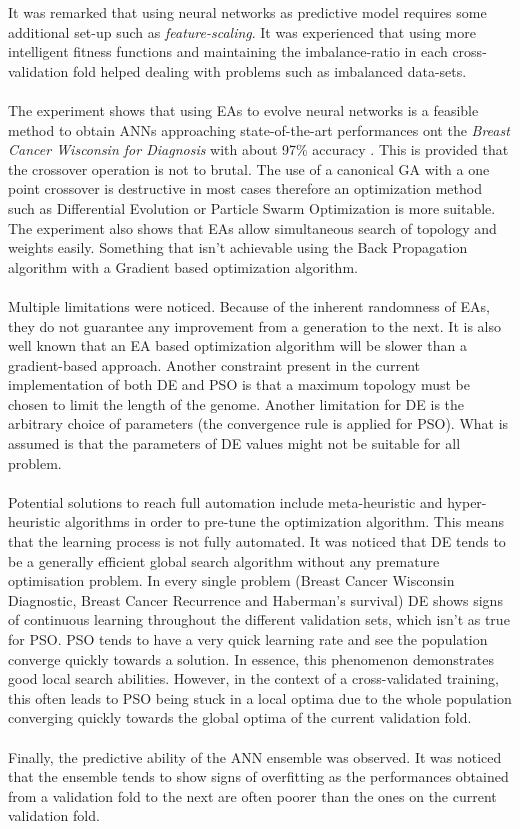 \documentclass[a4paper,12pt, oneside]{memoir}
\begin{document}
It was remarked that using neural networks as predictive model requires some additional set-up such as \textit{feature-scaling}. It was experienced that using more intelligent fitness functions and maintaining the imbalance-ratio in each cross-validation fold helped dealing with problems such as imbalanced data-sets.
\\ \\
The experiment shows that using EAs to evolve neural networks is a feasible method to obtain ANNs approaching state-of-the-art performances ont the \textit{Breast Cancer Wisconsin for Diagnosis} with about 97\% accuracy \cite{Gorunescu-2014}. This is provided that the crossover operation is not to brutal. The use of a canonical GA with a one point crossover is destructive in most cases therefore an optimization method such as Differential Evolution or Particle Swarm Optimization is more suitable. The experiment also shows that EAs allow simultaneous search of topology and weights easily. Something that isn't achievable using the Back Propagation algorithm with a Gradient based optimization algorithm.
\\ \\
Multiple limitations were noticed. Because of the inherent randomness of EAs, they do not guarantee any improvement from a generation to the next. It is also well known that an EA based optimization algorithm will be slower than a gradient-based approach. Another constraint present in the current implementation of both DE and PSO is that a maximum topology must be chosen to limit the length of the genome. Another limitation for DE is the arbitrary choice of parameters (the convergence rule is applied for PSO). What is assumed is that the parameters of DE values might not be suitable for all problem. 
\\ \\
Potential solutions to reach full automation include meta-heuristic and hyper-heuristic algorithms in order to pre-tune the optimization algorithm. This means that the learning process is not fully automated. It was noticed that DE tends to be a generally efficient global search algorithm without any premature optimisation problem. In every single problem (Breast Cancer Wisconsin Diagnostic, Breast Cancer Recurrence and Haberman's survival) DE shows signs of continuous learning throughout the different validation sets, which isn't as true for PSO. PSO tends to have a very quick learning rate and see the population converge quickly towards a solution. In essence, this phenomenon demonstrates good local search abilities. However, in the context of a cross-validated training, this often leads to PSO being stuck in a local optima due to the whole population converging quickly towards the global optima of the current validation fold.
\\ \\
Finally, the predictive ability of the ANN ensemble was observed. It was noticed that the ensemble tends to show signs of overfitting as the performances obtained from a validation fold to the next are often poorer than the ones on the current validation fold.
\end{document}
